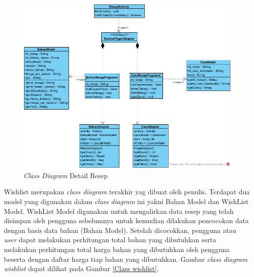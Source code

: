 		\begin{figure}[H]
			\centering
			\includegraphics[origin=c,width=1\textwidth]{gambar/class/DetailResep}
			\caption{\emph{Class Diagram} Detail Resep}
			\label{Class Diagram Detail Resep}
		\end{figure}

		Wishlist merupakan \textit{class diagram} terakhir yag dibuat oleh penulis. Terdapat dua model yang digunakan dalam \textit{class diagram} ini yakni Bahan Model dan WishList Model. WishList Model digunakan untuk mengalirkan data resep yang telah disimpan oleh pengguna sebelumnya untuk kemudian dilakukan pencocokan data dengan basis data bahan (Bahan Model). Setelah dicocokkan, pengguna atau \textit{user} dapat melakukan perhitungan total bahan yang dibutuhkan serta melakukan perhitungan total harga bahan yang dibutuhkan oleh pengguna beserta dengan daftar harga tiap bahan yang dibutuhkan. Gambar \textit{class diagram wishlist} dapat dilihat pada Gambar \ref{Class wishlist}.
		
